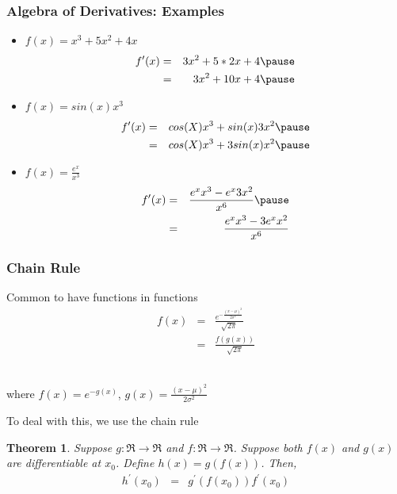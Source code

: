 \documentclass{beamer}
\newtheorem{thm}{Theorem}
\numberwithin{equation}{section}
\begin{document}
\begin{frame}
\frametitle{Algebra of Derivatives: Examples}

\begin{itemize}
\item[1)] $f(x)= x^3 + 5 x^2  + 4 x$ \pause
\begin{eqnarray}
f'(x) & = & 3 x^2 + 5 * 2x + 4 \nonumber \pause \\
      & = & 3 x^2 + 10x + 4 \nonumber \pause
\end{eqnarray}
     
\end{itemize}

\begin{itemize}
\item[2)] $f(x) = sin(x) x^3$ \pause
\begin{eqnarray}
f'(x) & = & cos(X)  x^3 + sin(x)  3 x^2 \nonumber \pause \\
& = & cos(X)  x^3 + 3 sin(x)  x^2 \nonumber \pause
\end{eqnarray}
\end{itemize}

\begin{itemize}
\item[3)] $f(x) = \frac{e^{x} }{x^3}$ \pause
\begin{eqnarray}
f'(x) & = & \frac{e^{x}  x^{3} - e^{x}  3 x^{2} }{x^6} \nonumber \pause \\
& = & \frac{e^{x}  x^{3} - 3 e^{x} x^{2} }{x^6} \nonumber
\end{eqnarray}

\end{itemize}

\end{frame}



\begin{frame}
\frametitle{Chain Rule} 
Common to have functions in functions
\begin{eqnarray}
f(x) & = & \frac{e^{ - \frac{(x - \mu)^2}{2 \sigma^2}}}{\sqrt{2 \pi }  } \nonumber \\
		& = & \frac{f (g(x)) } {\sqrt{2 \pi}} \nonumber 
\end{eqnarray}

\ \\where $f(x) = e ^{- g(x)}$, $g(x) = \frac{(x - \mu)^2}{2 \sigma^2}$ \pause

To deal with this, we use the \alert{chain rule} \pause

\begin{thm} 
Suppose $g: \Re \rightarrow \Re$ and $f: \Re \rightarrow \Re$. Suppose both $f(x)$ and $g(x)$ are differentiable at $x_{0}$.  Define $h(x) = g(f(x))$.  Then, 
\begin{eqnarray}
h^{'}(x_{0}) & = & g^{'}(f(x_{0}))f^{'}(x_{0}) \nonumber 
\end{eqnarray}
\end{thm}

\end{frame}
\end{document}
